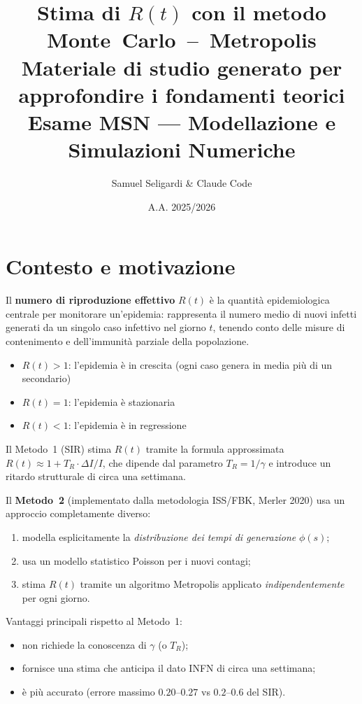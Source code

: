 \documentclass[12pt,a4paper]{article}
\title{%
  \textbf{Stima di $R(t)$ con il metodo \mbox{Monte Carlo -- Metropolis}}\\[0.5em]
  \large Materiale di studio generato per approfondire i fondamenti teorici\\[0.3em]
  \normalsize Esame MSN --- Modellazione e Simulazioni Numeriche
}
\author{Samuel Seligardi \& Claude Code}
\date{A.A. 2025/2026}
\begin{document}
\maketitle
\tableofcontents
\newpage

\section{Contesto e motivazione}

Il \textbf{numero di riproduzione effettivo} $R(t)$ è la quantità epidemiologica centrale
per monitorare un'epidemia: rappresenta il numero medio di nuovi infetti generati da un
singolo caso infettivo nel giorno $t$, tenendo conto delle misure di contenimento e
dell'immunità parziale della popolazione.

\begin{itemize}
  \item $R(t) > 1$: l'epidemia è in crescita (ogni caso genera in media più di un secondario)
  \item $R(t) = 1$: l'epidemia è stazionaria
  \item $R(t) < 1$: l'epidemia è in regressione
\end{itemize}

Il Metodo~1 (SIR) stima $R(t)$ tramite la formula approssimata
$R(t) \approx 1 + T_R \cdot \Delta I / I$, che dipende dal parametro $T_R = 1/\gamma$
e introduce un ritardo strutturale di circa una settimana.

Il \textbf{Metodo~2} (implementato dalla metodologia ISS/FBK, Merler 2020)
usa un approccio completamente diverso:
\begin{enumerate}
  \item modella esplicitamente la \emph{distribuzione dei tempi di generazione} $\phi(s)$;
  \item usa un modello statistico Poisson per i nuovi contagi;
  \item stima $R(t)$ tramite un algoritmo Metropolis applicato \emph{indipendentemente}
        per ogni giorno.
\end{enumerate}

Vantaggi principali rispetto al Metodo~1:
\begin{itemize}
  \item non richiede la conoscenza di $\gamma$ (o $T_R$);
  \item fornisce una stima che anticipa il dato INFN di circa una settimana;
  \item è più accurato (errore massimo $0.20$--$0.27$ vs $0.2$--$0.6$ del SIR).
\end{itemize}
\end{document}
